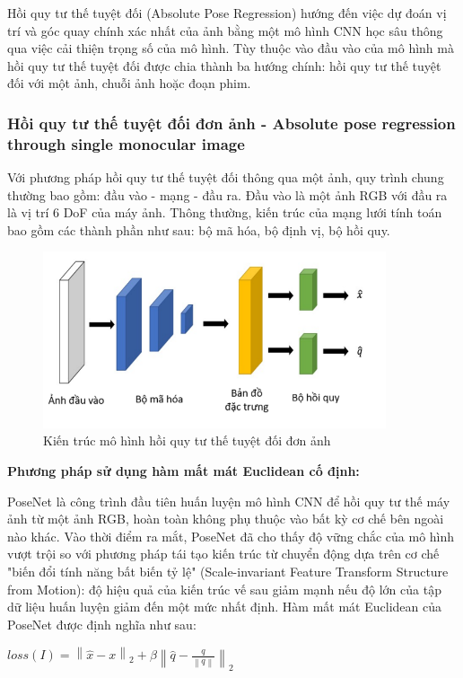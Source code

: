 Hồi quy tư thế tuyệt đối (Absolute Pose Regression) hướng đến việc dự đoán vị trí và góc quay chính xác nhất của ảnh bằng một mô hình CNN học sâu thông qua việc cải thiện trọng số của mô hình. Tùy thuộc vào đầu vào của mô hình mà hồi quy tư thế tuyệt đối được chia thành ba hướng chính: hồi quy tư thế tuyệt đối với một ảnh, chuỗi ảnh hoặc đoạn phim.

\subsubsection*{Hồi quy tư thế tuyệt đối đơn ảnh - Absolute pose regression through single monocular image}
Với phương pháp hồi quy tư thế tuyệt đối thông qua một ảnh, quy trình chung thường bao gồm: đầu vào - mạng - đầu ra. Đầu vào là một ảnh RGB với đầu ra là vị trí 6 DoF của máy ảnh. Thông thường, kiến trúc của mạng lưới tính toán bao gồm các thành phần như sau: bộ mã hóa, bộ định vị, bộ hồi quy.

\begin{figure}[H]
    \centering
    \includegraphics[width=0.9\textwidth]{pics/Chapter2/kientruc_APR_1.png}
    \caption{Kiến trúc mô hình hồi quy tư thế tuyệt đối đơn ảnh \cite{kendall2016posenet}}
\end{figure}

\noindent\textbf{Phương pháp sử dụng hàm mất mát Euclidean cố định:}

PoseNet \cite{kendall2016posenet} là công trình đầu tiên huấn luyện mô hình CNN để hồi quy tư thế máy ảnh từ một ảnh RGB, hoàn toàn không phụ thuộc vào bất kỳ cơ chế bên ngoài nào khác. Vào thời điểm ra mắt, PoseNet đã cho thấy độ vững chắc của mô hình vượt trội so với phương pháp tái tạo kiến trúc từ chuyển động dựa trên cơ chế "biến đổi tính năng bất biến tỷ lệ" (Scale-invariant Feature Transform Structure from Motion): độ hiệu quả của kiến trúc vế sau giảm mạnh nếu độ lớn của tập dữ liệu huấn luyện giảm đến một mức nhất định. Hàm mất mát Euclidean của PoseNet được định nghĩa như sau:
\begin{center}
    $loss(I) = \left \| \hat{x} - x \right \|_2 + \beta \left \| \hat{q} - \frac{q}{\left \| q \right \|} \right \|_2$
\end{center}

